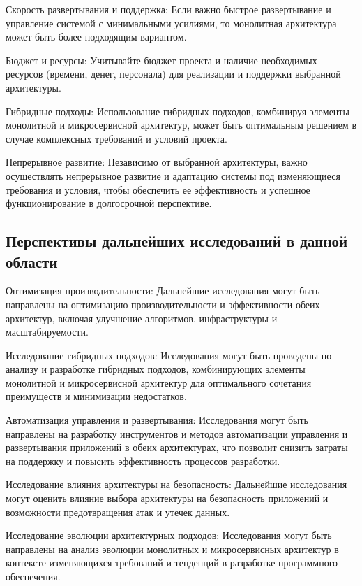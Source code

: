     Скорость развертывания и поддержка: Если важно быстрое развертывание и управление системой с минимальными усилиями, то монолитная архитектура может быть более подходящим вариантом.

    Бюджет и ресурсы: Учитывайте бюджет проекта и наличие необходимых ресурсов (времени, денег, персонала) для реализации и поддержки выбранной архитектуры.

    Гибридные подходы: Использование гибридных подходов, комбинируя элементы монолитной и микросервисной архитектур, может быть оптимальным решением в случае комплексных требований и условий проекта.

    Непрерывное развитие: Независимо от выбранной архитектуры, важно осуществлять непрерывное развитие и адаптацию системы под изменяющиеся требования и условия, чтобы обеспечить ее эффективность и успешное функционирование в долгосрочной перспективе.



\subsection{Перспективы дальнейших исследований в данной области}

    Оптимизация производительности: Дальнейшие исследования могут быть направлены на оптимизацию производительности и эффективности обеих архитектур, включая улучшение алгоритмов, инфраструктуры и масштабируемости.

    Исследование гибридных подходов: Исследования могут быть проведены по анализу и разработке гибридных подходов, комбинирующих элементы монолитной и микросервисной архитектур для оптимального сочетания преимуществ и минимизации недостатков.

    Автоматизация управления и развертывания: Исследования могут быть направлены на разработку инструментов и методов автоматизации управления и развертывания приложений в обеих архитектурах, что позволит снизить затраты на поддержку и повысить эффективность процессов разработки.

    Исследование влияния архитектуры на безопасность: Дальнейшие исследования могут оценить влияние выбора архитектуры на безопасность приложений и возможности предотвращения атак и утечек данных.

    Исследование эволюции архитектурных подходов: Исследования могут быть направлены на анализ эволюции монолитных и микросервисных архитектур в контексте изменяющихся требований и тенденций в разработке программного обеспечения.

